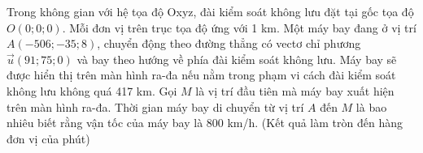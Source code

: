 \begin{ex}%
	Trong không gian với hệ tọa độ Oxyz, đài kiểm soát không lưu đặt tại gốc tọa độ $O(0;0;0)$. Mỗi đơn vị trên trục tọa độ ứng với 1 km. Một máy bay đang ở vị trí $A(-506;-35;8)$, chuyển động theo đường thẳng có vectơ chỉ phương $\vec{u}(91;75;0)$ và bay theo hướng về phía đài kiểm soát không lưu. Máy bay sẽ được hiển thị trên màn hình ra-đa nếu nằm trong phạm vi cách đài kiểm soát không lưu không quá 417 km. Gọi $M$ là vị trí đầu tiên mà máy bay xuất hiện trên màn hình ra-đa. Thời gian máy bay di chuyển từ vị trí $A$ đến $M$ là bao nhiêu biết rằng vận tốc của máy bay là 800 km/h. (Kết quả làm tròn đến hàng đơn vị của phút)
\end{ex}

